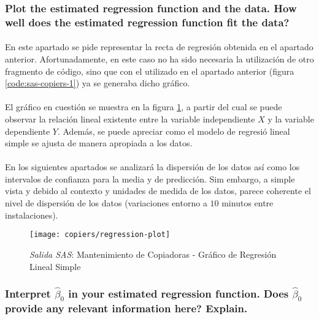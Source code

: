 \documentclass{article}
\begin{document}
      \subsubsection{Plot the estimated regression function and the data. How well does the estimated regression function fit the data?}

        \paragraph{}
        En este apartado se pide representar la recta de regresión obtenida en el apartado anterior. Afortunadamente, en este caso no ha sido necesaria la utilización de otro fragmento de código, sino que con el utilizado en el apartado anterior (figura \ref{code:sas-copiers-1}) ya se generaba dicho gráfico.

        \paragraph{}
        El gráfico en cuestión se muestra en la figura \ref{img:copiers-regression-plot}, a partir del cual se puede observar la relación lineal existente entre la variable independiente $X$ y la variable dependiente $Y$. Además, se puede apreciar como el modelo de regresió lineal simple se ajusta de manera apropiada a los datos.

        \paragraph{}
        En los siguientes apartados se analizará la dispersión de los datos así como los intervalos de confianza para la media y de predicción. Sim embargo, a simple vista y debido al contexto y unidades de medida de los datos, parece coherente el nivel de dispersión de los datos (variaciones entorno a $10$ minutos entre instalaciones).

        \begin{figure}[!h]
          \centering
          \texttt{[image: copiers/regression-plot]}
          \caption{\emph{Salida SAS}: Mantenimiento de Copiadoras - Gráfico de Regresión Lineal Simple}
          \label{img:copiers-regression-plot}
        \end{figure}

      \subsubsection{Interpret $\widehat{\beta}_0$ in your estimated regression function. Does $\widehat{\beta}_0$ provide any relevant information here? Explain.}
\end{document}
